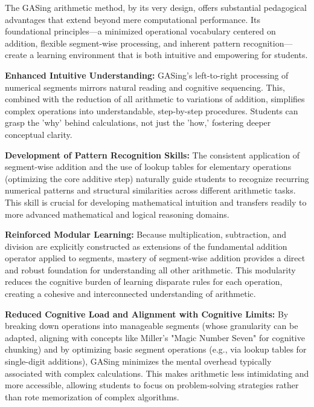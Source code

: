 The GASing arithmetic method, by its very design, offers substantial pedagogical advantages that extend beyond mere computational performance. Its foundational principles—a minimized operational vocabulary centered on addition, flexible segment-wise processing, and inherent pattern recognition—create a learning environment that is both intuitive and empowering for students.


\noindent\textbf{\textbf{Enhanced Intuitive Understanding}:} GASing's left-to-right processing of numerical segments mirrors natural reading and cognitive sequencing. This, combined with the reduction of all arithmetic to variations of addition, simplifies complex operations into understandable, step-by-step procedures. Students can grasp the 'why' behind calculations, not just the 'how,' fostering deeper conceptual clarity.



\noindent\textbf{\textbf{Development of Pattern Recognition Skills}:} The consistent application of segment-wise addition and the use of lookup tables for elementary operations (optimizing the core additive step) naturally guide students to recognize recurring numerical patterns and structural similarities across different arithmetic tasks. This skill is crucial for developing mathematical intuition and transfers readily to more advanced mathematical and logical reasoning domains.



\noindent\textbf{\textbf{Reinforced Modular Learning}:} Because multiplication, subtraction, and division are explicitly constructed as extensions of the fundamental addition operator applied to segments, mastery of segment-wise addition provides a direct and robust foundation for understanding all other arithmetic. This modularity reduces the cognitive burden of learning disparate rules for each operation, creating a cohesive and interconnected understanding of arithmetic.



\noindent\textbf{\textbf{Reduced Cognitive Load and Alignment with Cognitive Limits}:} By breaking down operations into manageable segments (whose granularity can be adapted, aligning with concepts like Miller's "Magic Number Seven" for cognitive chunking) and by optimizing basic segment operations (e.g., via lookup tables for single-digit additions), GASing minimizes the mental overhead typically associated with complex calculations. This makes arithmetic less intimidating and more accessible, allowing students to focus on problem-solving strategies rather than rote memorization of complex algorithms.



